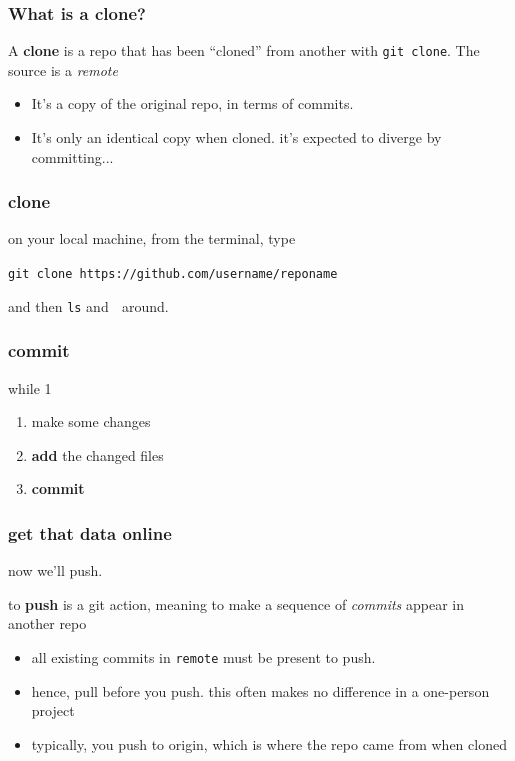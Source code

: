 \documentclass[14pt,aspectratio=1610]{beamer} %
\newcommand{\fframe}[2]{
   \begin{frame}
\frametitle{#1}
#2
\end{frame}
}
\begin{document}
\fframe{What is a clone?}
{
\begin{definition}
	A {\bf clone} is a repo that has been ``cloned'' from another with {\tt git clone}.  The source is a {\em remote}
\end{definition}

	\vspace{\baselineskip}

	\begin{itemize}
		\item It's a copy of the original repo, in terms of commits.  
		\item It's only an identical copy when cloned.  it's expected to diverge by committing...
	\end{itemize}
}

\fframe{clone}
{
	on your local machine, from the terminal, type

\vspace{\baselineskip}

	{\tt git clone https://github.com/username/reponame}

\vspace{\baselineskip}
and then {\tt ls} and 👀 around.  
}

\fframe{commit}
{
while 1
\begin{enumerate}
	\item make some changes
	\item {\bf add} the changed files
	\item {\bf commit}
\end{enumerate}
}



\fframe{get that data online}
{
	now we'll push.
	\begin{definition}
to {\bf push} is a git action, meaning to make a sequence of {\em commits} appear in another repo
	\end{definition}

	\vspace{\baselineskip}

	\begin{itemize}
	\item all existing commits in {\tt remote} must be present to push.  
	\item hence, pull before you push.  this often makes no difference in a one-person project
	\item typically, you push to origin, which is where the repo came from when cloned
	\end{itemize}
}
\end{document}

